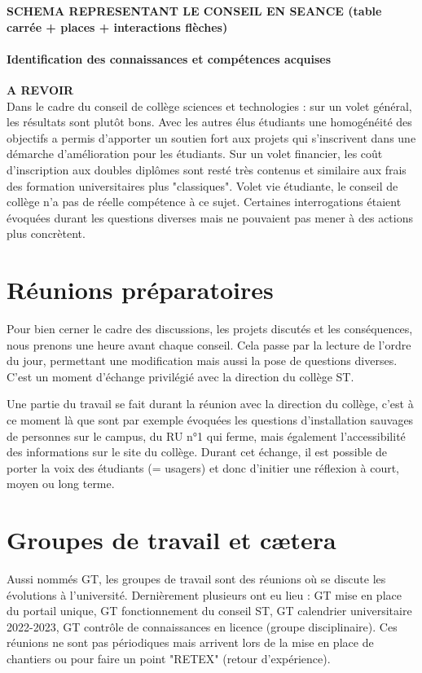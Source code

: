 \documentclass{article}
\begin{document}
\textbf{SCHEMA REPRESENTANT LE CONSEIL EN SEANCE (table carrée + places + interactions flèches)}
\paragraph{Identification des connaissances et compétences acquises} \textbf{A REVOIR} \\
Dans le cadre du conseil de collège sciences et technologies : sur un volet général, les résultats sont plutôt bons. Avec les autres élus étudiants une homogénéité des objectifs a permis d'apporter un soutien fort aux projets qui s'inscrivent dans une démarche d'amélioration pour les étudiants. Sur un volet financier, les coût d'inscription aux doubles diplômes sont resté très contenus et similaire aux frais des formation universitaires plus "classiques". Volet vie étudiante, le conseil de collège n'a pas de réelle compétence à ce sujet. Certaines interrogations étaient évoquées durant les questions diverses mais ne pouvaient pas mener à des actions plus concrètent.



\newpage
\section{Réunions préparatoires} 
Pour bien cerner le cadre des discussions, les projets discutés et les conséquences, nous prenons une heure avant chaque conseil. Cela passe par la lecture de l'ordre du jour, permettant une modification mais aussi la pose de questions diverses. C'est un moment d'échange privilégié avec la direction du collège ST. 

Une partie du travail se fait durant la réunion avec la direction du collège, c'est à ce moment là que sont par exemple évoquées les questions d'installation sauvages de personnes sur le campus, du RU n°1 qui ferme, mais également l'accessibilité des informations sur le site du collège. Durant cet échange, il est possible de porter la voix des étudiants (= usagers) et donc d'initier une réflexion à court, moyen ou long terme.

\newpage
\section{Groupes de travail et cætera}
Aussi nommés GT, les groupes de travail sont des réunions où se discute les évolutions à l'université. Dernièrement plusieurs ont eu lieu : GT mise en place du portail unique, GT fonctionnement du conseil ST, GT calendrier  universitaire 2022-2023, GT contrôle de connaissances en licence (groupe disciplinaire). Ces réunions ne sont pas périodiques mais arrivent lors de la mise en place de chantiers ou pour faire un point "RETEX" (retour d'expérience).
\end{document}
